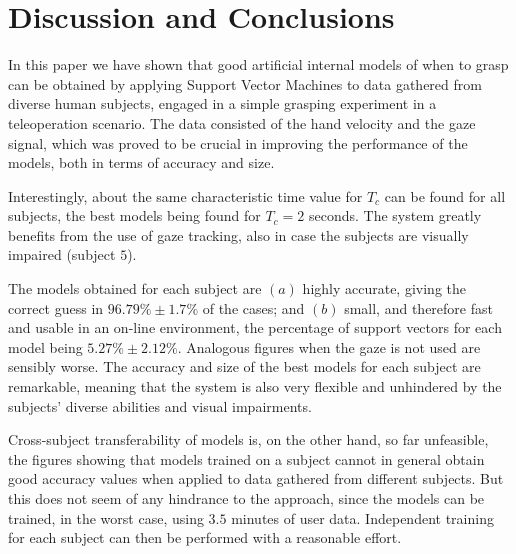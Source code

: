 \documentclass[jou,a4paper,notxfonts]{apa}
\begin{document}
\section{Discussion and Conclusions}

\label{sec:concl}

In this paper we have shown that good artificial internal models of
when to grasp can be obtained by applying Support Vector Machines to
data gathered from diverse human subjects, engaged in a simple
grasping experiment in a teleoperation scenario. The data consisted of
the hand velocity and the gaze signal, which was proved to be crucial
in improving the performance of the models, both in terms of accuracy
and size.

Interestingly, about the same characteristic time value for $T_c$ can
be found for all subjects, the best models being found for $T_c=2$
seconds. The system greatly benefits from the use of gaze tracking,
also in case the subjects are visually impaired (subject $5$).

The models obtained for each subject are $(a)$ highly accurate, giving
the correct guess in $96.79\% \pm 1.7\%$ of the cases; and $(b)$
small, and therefore fast and usable in an on-line environment, the
percentage of support vectors for each model being $5.27\% \pm
2.12\%$. Analogous figures when the gaze is not used are sensibly
worse. The accuracy and size of the best models for each subject are
remarkable, meaning that the system is also very flexible and
unhindered by the subjects' diverse abilities and visual impairments.

Cross-subject transferability of models is, on the other hand, so far
unfeasible, the figures showing that models trained on a subject
cannot in general obtain good accuracy values when applied to data
gathered from different subjects. But this does not seem of any
hindrance to the approach, since the models can be trained, in the
worst case, using $3.5$ minutes of user data. Independent training for
each subject can then be performed with a reasonable effort.



\end{document}
